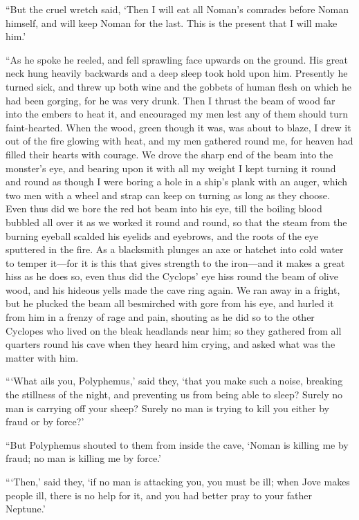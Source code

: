 “But the cruel wretch said, ‘Then I will eat all Noman’s comrades before Noman
himself, and will keep Noman for the last. This is the present that I will make
him.’

“As he spoke he reeled, and fell sprawling face upwards on the ground. His
great neck hung heavily backwards and a deep sleep took hold upon him.
Presently he turned sick, and threw up both wine and the gobbets of human flesh
on which he had been gorging, for he was very drunk. Then I thrust the beam of
wood far into the embers to heat it, and encouraged my men lest any of them
should turn faint-hearted. When the wood, green though it was, was about to
blaze, I drew it out of the fire glowing with heat, and my men gathered round
me, for heaven had filled their hearts with courage. We drove the sharp end of
the beam into the monster’s eye, and bearing upon it with all my weight I kept
turning it round and round as though I were boring a hole in a ship’s plank
with an auger, which two men with a wheel and strap can keep on turning as long
as they choose. Even thus did we bore the red hot beam into his eye, till the
boiling blood bubbled all over it as we worked it round and round, so that the
steam from the burning eyeball scalded his eyelids and eyebrows, and the roots
of the eye sputtered in the fire. As a blacksmith plunges an axe or hatchet
into cold water to temper it—for it is this that gives strength to the iron—and
it makes a great hiss as he does so, even thus did the Cyclops’ eye hiss round
the beam of olive wood, and his hideous yells made the cave ring again. We ran
away in a fright, but he plucked the beam all besmirched with gore from his
eye, and hurled it from him in a frenzy of rage and pain, shouting as he did so
to the other Cyclopes who lived on the bleak headlands near him; so they
gathered from all quarters round his cave when they heard him crying, and asked
what was the matter with him.

“‘What ails you, Polyphemus,’ said they, ‘that you make such a noise, breaking
the stillness of the night, and preventing us from being able to sleep? Surely
no man is carrying off your sheep? Surely no man is trying to kill you either
by fraud or by force?’

“But Polyphemus shouted to them from inside the cave, ‘Noman is killing me by
fraud; no man is killing me by force.’

“‘Then,’ said they, ‘if no man is attacking you, you must be ill; when Jove
makes people ill, there is no help for it, and you had better pray to your
father Neptune.’


